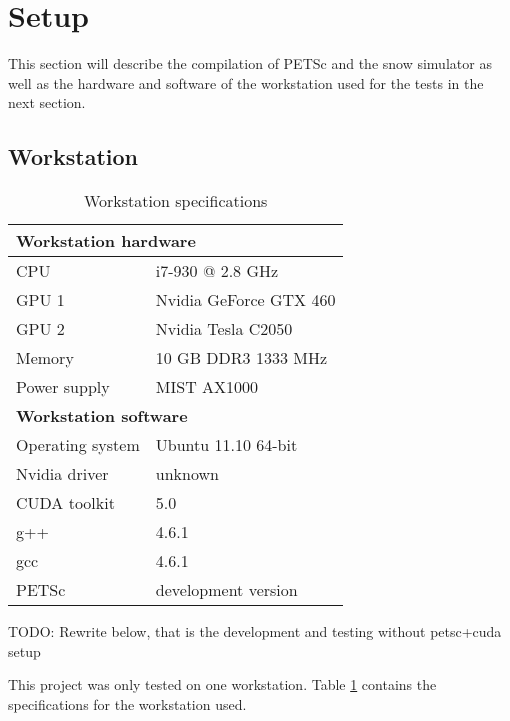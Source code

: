 \section{Setup}

This section will describe the compilation of PETSc and the snow simulator as well 
as the hardware and software of the workstation used for the tests in the next section. 

\subsection{Workstation}


\begin{table}[h]
	\begin{center}
	\bgroup
	\def\arraystretch{1.2}
	\begin{tabular}{|l|l|}
		\hline
		\multicolumn{2}{|l|}{\textbf{Workstation hardware}} \\ \hline
		CPU & i7-930 @ 2.8 GHz \\ \hline
		GPU 1 & Nvidia GeForce GTX 460 \\ \hline
		GPU 2 & Nvidia Tesla C2050 \\ \hline
		Memory & 10 GB DDR3 1333 MHz \\ \hline
		Power supply & MIST AX1000 \\ \hline
		\multicolumn{2}{|l|}{\textbf{Workstation software}} \\ \hline
		Operating system & Ubuntu 11.10 64-bit \\ \hline
		Nvidia driver & unknown \\ \hline
		CUDA toolkit & 5.0 \\ \hline
		g++ & 4.6.1 \\ \hline
		gcc & 4.6.1 \\ \hline
		PETSc & development version \\ \hline
	\end{tabular}
	\egroup
	\end{center}
	\caption{Workstation specifications}
	\label{table:workstation}
\end{table}

TODO: Rewrite below, that is the development and testing without petsc+cuda setup

This project was only tested on one workstation. Table \ref{table:workstation} contains 
the specifications for the workstation used.

